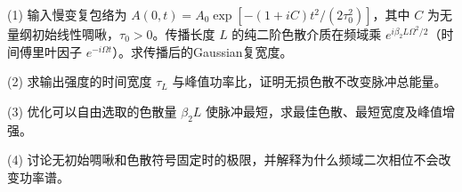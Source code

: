 (1) 输入慢变复包络为 \(A(0,t)=A_0\exp[-(1+iC)t^2/(2\tau_0^2)]\)，其中 \(C\) 为无量纲初始线性啁啾，\(\tau_0>0\)。传播长度 \(L\) 的纯二阶色散介质在频域乘 \(e^{i\beta_2L\Omega^2/2}\)（时间傅里叶因子 \(e^{-i\Omega t}\)）。求传播后的Gaussian复宽度。

(2) 求输出强度的时间宽度 \(\tau_L\) 与峰值功率比，证明无损色散不改变脉冲总能量。

(3) 优化可以自由选取的色散量 \(\beta_2L\) 使脉冲最短，求最佳色散、最短宽度及峰值增强。

(4) 讨论无初始啁啾和色散符号固定时的极限，并解释为什么频域二次相位不会改变功率谱。
